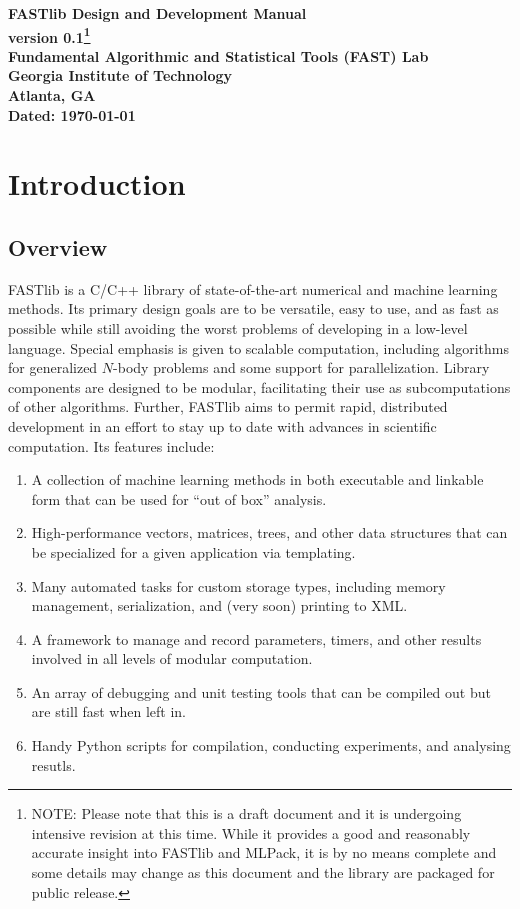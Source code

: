 \documentclass[letter]{report}
\begin{document}
\begin{titlepage}
\begin{center}
\large \bf
FASTlib Design and Development Manual\\
\normalsize version 0.1\footnote{
NOTE: Please note that this is a draft document and it is undergoing intensive revision at this time. While it provides a good and reasonably accurate insight into FASTlib and MLPack, it is by no means complete and some details may change as this document and the library are packaged for public release.
}\\ 
\large \bf Fundamental Algorithmic and Statistical Tools (FAST) Lab\\
Georgia Institute of Technology\\
Atlanta, GA\\
Dated: \today
\end{center}

\end{titlepage}

\tableofcontents

\chapter {Introduction}

\section {Overview}
FASTlib is a C/C++ library of state-of-the-art numerical and machine
learning methods.  Its primary design goals are to be versatile, easy
to use, and as fast as possible while still avoiding the worst
problems of developing in a low-level language.  Special emphasis is
given to scalable computation, including algorithms for generalized
$N$-body problems \cite{gray2000nbp} and some support for
parallelization.  Library components are designed to be modular,
facilitating their use as subcomputations of other algorithms.
Further, FASTlib aims to permit rapid, distributed development in an
effort to stay up to date with advances in scientific computation.
Its features include:
\begin{enumerate}
\item A collection of machine learning methods in both executable and
  linkable form that can be used for ``out of box'' analysis.
\item High-performance vectors, matrices, trees, and other data
  structures that can be specialized for a given application via
  templating.
\item Many automated tasks for custom storage types, including memory
  management, serialization, and (very soon) printing to XML.
\item A framework to manage and record parameters, timers, and other
  results involved in all levels of modular computation.
\item An array of debugging and unit testing tools that can be
  compiled out but are still fast when left in.
\item Handy Python scripts for compilation, conducting experiments,
  and analysing resutls.
\end{enumerate}
\end{document}
